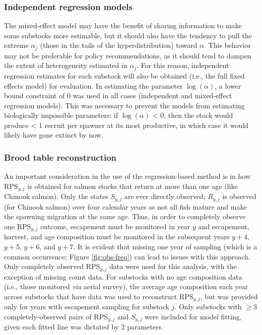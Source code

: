 \documentclass[12pt,]{book}
\theoremstyle{definition}
\theoremstyle{definition}
\theoremstyle{definition}
\theoremstyle{remark}
\begin{document}
\subsubsection{Independent regression models}\label{lm-methods}

\noindent
The mixed-effect model may have the benefit of sharing information to
make some substocks more estimable, but it should also have the tendency
to pull the extreme \(\alpha_j\) (those in the tails of the
hyperdistribution) toward \(\alpha\). This behavior may not be
preferable for policy recommendations, as it should tend to dampen the
extent of heterogeneity estimated in \(\alpha_j\). For this reason,
independent regression estimates for each substock will also be obtained
(i.e., the full fixed effects model) for evaluation. In estimating the
parameter \(\log(\alpha)\), a lower bound constraint of 0 was used in
all cases (independent and mixed-effect regression models). This was
necessary to prevent the models from estimating biologically impossible
parameters: if \(\log(\alpha)\) \textless{} 0, then the stock would
produce \textless{} 1 recruit per spawner at its most productive, in
which case it would likely have gone extinct by now.

\subsubsection{Brood table reconstruction}\label{lm-btable}

\noindent
An important consideration in the use of the regression-based method is
in how \(\text{RPS}_{y,j}\) is obtained for salmon stocks that return at
more than one age (like Chinook salmon). Only the states \(S_{y,j}\) are
ever directly observed; \(R_{y,j}\) is observed (for Chinook salmon)
over four calendar years as not all fish mature and make the spawning
migration at the same age. Thus, in order to completely observe one
\(\text{RPS}_{y,j}\) outcome, escapement must be monitored in year \(y\)
and escapement, harvest, and age composition must be monitored in the
subsequent years \(y+4\), \(y+5\), \(y+6\), and \(y+7\). It is evident
that missing one year of sampling (which is a common occurrence; Figure
\ref{fig:obs-freq}) can lead to issues with this approach. Only
completely observed \(\text{RPS}_{y,j}\) data were used for this
analysis, with the exception of missing count data. For substocks with
no age composition data (i.e., those monitored \emph{via} aerial
survey), the average age composition each year across substocks that
have data was used to reconstruct \(\text{RPS}_{y,j}\), but was provided
only for years with escapement sampling for substock \(j\). Only
substocks with \(\ge3\) completely-observed pairs of
\(\text{RPS}_{y,j}\) and \(S_{y,j}\) were included for model fitting,
given each fitted line was dictated by 2 parameters.
\end{document}

